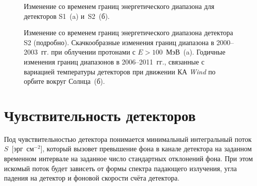 \begin{figure}[h]
  \begin{minipage}[h]{0.5\textwidth}
  \end{minipage}
  \hfill
  \begin{minipage}[h]{0.5\textwidth}
  \end{minipage}
  \caption[Изменение со временем границ энергетического диапазона для детектора S1 и~S2.]
  {Изменение со временем границ энергетического диапазона для детекторов S1~(a) и~S2~(б).}
  \label{img:KW_E_boundaries}  
\end{figure}

\begin{figure}[h]
  \begin{minipage}[h]{0.5\textwidth}
  \end{minipage}
  \hfill
  \begin{minipage}[h]{0.5\textwidth}
  \end{minipage}
  \caption[Изменение со временем границ энергетического диапазона детектора S2 
  в 2000--2003~гг. и 2006--2011~гг.]
  {Изменение со временем границ энергетического диапазона детектора S2 (подробно). 
  Скачкообразные изменения границ диапазона в 2000--2003~гг. при облучении протонами с $E>100$~МэВ~(a). 
  Годичные изменения границ диапазонов в 2006--2011~гг., связанные с вариацией температуры детекторов 
  при движении КА \textit{Wind} по орбите вокруг Солнца~(б).}
  \label{img:KW_E_boundaries_features}  
\end{figure}

\section{Чувствительность детекторов}
Под чувствительностью детектора понимается минимальный интегральный поток $S$~[эрг~см$^{-2}$], 
который вызовет превышение фона в канале детектора на заданном временном интервале 
на заданное число стандартных отклонений фона. При этом искомый поток будет зависеть 
от формы спектра падающего излучения, угла падения на детектор и фоновой скорости счёта детектора.

